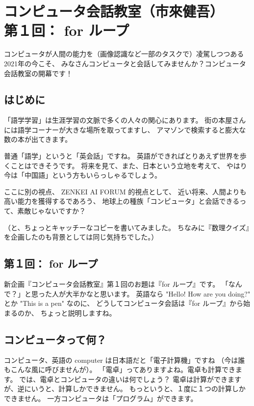 \documentclass[dvipdfmx,autodetect-engine,10pt,b5paper,papersize,openany,dvipsnames]{jsbook}
\begin{document}
\chapter[コンピュータ会話教室（市來健吾）]{コンピュータ会話教室（市來健吾）\\第１回： for ループ}
\label{ch:ichiki}
\thispagestyle{fancy}

コンピュータが人間の能力を（画像認識など一部のタスクで）凌駕しつつある2021年の今こそ、
みなさんコンピュータと会話してみませんか？コンピュータ会話教室の開幕です！


\begin{multicols}{2}

\section*{はじめに}
「語学学習」は生涯学習の文脈で多くの人々の関心にあります。
街の本屋さんには語学コーナーが大きな場所を取ってますし、
アマゾンで検索すると膨大な数の本が出てきます。

普通「語学」というと「英会話」ですね。
英語ができればとりあえず世界を歩くことはできそうです。
将来を見て、また、日本という立地を考えて、
やはり今は「中国語」という方もいらっしゃるでしょう。

ここに別の視点、 ZENKEI AI FORUM 的視点として、
近い将来、人間よりも高い能力を獲得するであろう、
地球上の種族「コンピュータ」と会話できるって、素敵じゃないですか？

（と、ちょっとキャッチーなコピーを書いてみました。
ちなみに『数理クイズ』を企画したのも背景としては同じ気持ちでした。）

\section*{第１回： for ループ}
新企画『コンピュータ会話教室』第１回のお題は『for ループ』です。
「なんで？」と思った人が大半かなと思います。
英語なら "Hello! How are you doing?" とか "This is a pen" なのに、
どうしてコンピュータ会話は『for ループ』から始まるのか、
ちょっと説明しますね。

\section*{コンピュータって何？}
コンピュータ、英語の computer は日本語だと「電子計算機」ですね
（今は誰もこんな風に呼びませんが）。
「電卓」ってありますよね。電卓も計算できます。
では、電卓とコンピュータの違いは何でしょう？
電卓は計算ができますが、逆にいうと、計算しかできません。
もっというと、１度に１つの計算しかできません。
一方コンピュータは「プログラム」ができます。


\end{multicols}
\end{document}
